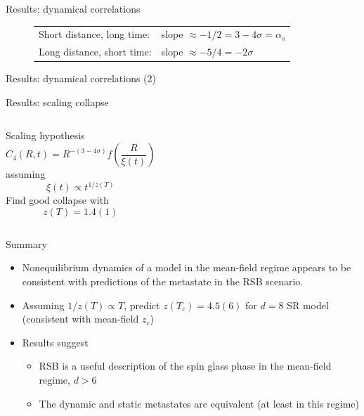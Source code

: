 \documentclass{beamer}
\newcommand{\del}[1]{\left(#1\right)}
\begin{document}
\begin{frame}{Results: dynamical correlations}
  \begin{figure}
    \centering
    
    \begin{tabular}{ll}
      \alert{Short distance, long time:} &
        \alert{slope $\approx -1/2 = 3-4\sigma=\alpha_s$} \\
      Long distance, short time: &
        slope $\approx -5/4 = -2\sigma$
    \end{tabular}
  \end{figure}
\end{frame}

\begin{frame}{Results: dynamical correlations (2)}
  \begin{figure}
    \centering
    
  \end{figure}
\end{frame}

\begin{frame}[fragile]{Results: scaling collapse}
  \begin{columns}
    Scaling hypothesis
    \begin{equation*}
      C_4(R,t)=R^{-(3-4\sigma)} f\del{\frac{R}{\xi(t)}}
    \end{equation*}
    assuming
    \begin{equation*}
      \xi(t) \propto t^{1/z(T)}
    \end{equation*}
    Find good collapse with
    \begin{equation*}
      z(T) = 1.4(1)
    \end{equation*}
    \begin{figure}
      
    \end{figure}
  \end{columns}
\end{frame}

\begin{frame}{Summary}
  \begin{itemize}
  \item
    Nonequilibrium dynamics of a model in the mean-field regime appears
    to be consistent with predictions of the metastate in the RSB scenario.
    \item 
      Assuming $1/z(T) \propto T$, predict $z(T_c)=4.5(6)$ for $d=8$ SR model
      (consistent with mean-field $z_c$)
    \item Results suggest
    \begin{itemize}
      \item RSB is a useful description of the spin glass phase in the
        mean-field regime, $d>6$
      \item The dynamic and static metastates are equivalent (at least in this regime)
    \end{itemize}
  \end{itemize}
\end{frame}
\end{document}
